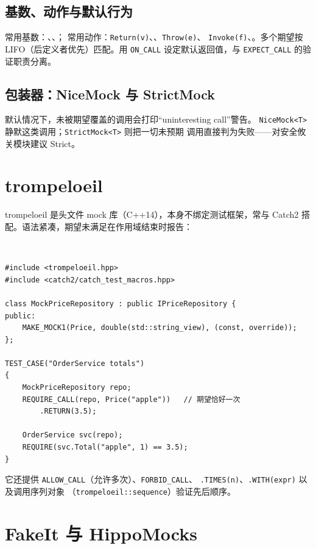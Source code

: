 \documentclass[12pt,a4paper,fontset=fandol]{ctexbook}
\newcommand{\cpplabel}{%
  \begin{tcolorbox}[enhanced,colback=cppheadbg,colframe=cppheadbg,
    arc=1mm,boxrule=0mm,left=6pt,right=6pt,top=2pt,bottom=2pt,
    halign=left,oversize]
    \textcolor{white}{\small\bfseries C++}
  \end{tcolorbox}\vspace{-4pt}}
\begin{document}
\subsection{基数、动作与默认行为}

常用基数：、、；
常用动作：\texttt{Return(v)}、、\texttt{Throw(e)}、
\texttt{Invoke(f)}、。多个期望按
LIFO（后定义者优先）匹配。用 \texttt{ON\_CALL} 设定默认返回值，与
\texttt{EXPECT\_CALL} 的验证职责分离。

\subsection{包装器：NiceMock 与 StrictMock}

默认情况下，未被期望覆盖的调用会打印“uninteresting call”警告。
\texttt{NiceMock<T>} 静默这类调用；\texttt{StrictMock<T>} 则把一切未预期
调用直接判为失败——对安全攸关模块建议 Strict。

\section{trompeloeil}

trompeloeil 是头文件 mock 库（C++14），本身不绑定测试框架，常与 Catch2
搭配。语法紧凑，期望未满足在作用域结束时报告：

\cpplabel
\begin{lstlisting}
#include <trompeloeil.hpp>
#include <catch2/catch_test_macros.hpp>

class MockPriceRepository : public IPriceRepository {
public:
    MAKE_MOCK1(Price, double(std::string_view), (const, override));
};

TEST_CASE("OrderService totals")
{
    MockPriceRepository repo;
    REQUIRE_CALL(repo, Price("apple"))   // 期望恰好一次
        .RETURN(3.5);

    OrderService svc(repo);
    REQUIRE(svc.Total("apple", 1) == 3.5);
}
\end{lstlisting}

它还提供 \texttt{ALLOW\_CALL}（允许多次）、\texttt{FORBID\_CALL}、
\texttt{.TIMES(n)}、\texttt{.WITH(expr)} 以及调用序列对象
（\texttt{trompeloeil::sequence}）验证先后顺序。

\section{FakeIt 与 HippoMocks}
\end{document}
